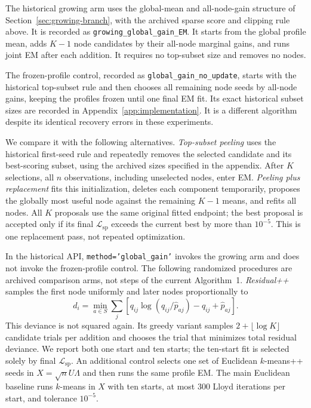 The historical growing arm uses the global-mean and all-node-gain structure of Section~\ref{sec:growing-branch}, with the archived sparse score and clipping rule above. It is recorded as
\texttt{growing\_global\_gain\_EM}. It starts from the global profile mean,
adds $K-1$ node candidates by their all-node marginal gains, and runs joint
EM after each addition. It requires no top-subset size and removes no nodes.

The frozen-profile control, recorded as \texttt{global\_gain\_no\_update},
starts with the historical top-subset rule and then chooses all remaining
node seeds by all-node gains, keeping the profiles frozen until one final EM
fit. Its exact historical subset sizes are recorded in
Appendix~\ref{app:implementation}. It is a different algorithm despite its
identical recovery errors in these experiments.

We compare it with the following alternatives. \emph{Top-subset peeling}
uses the historical first-seed rule and repeatedly removes the selected candidate and its best-scoring subset, using the archived sizes specified in the appendix.
After $K$ selections, all $n$ observations, including unselected nodes, enter
EM. \emph{Peeling plus replacement} fits this initialization, deletes each
component temporarily, proposes the globally most useful node against the
remaining $K-1$ means, and refits all nodes. All $K$ proposals use the same
original fitted endpoint; the best proposal is accepted only if its final
$\mathcal L_{\mathrm{sp}}$ exceeds the current best by more than $10^{-5}$. This is one
replacement pass, not repeated optimization.

In the historical API, \texttt{method='global\_gain'} invokes the growing arm and does not invoke the frozen-profile control. The following randomized procedures are archived comparison arms, not steps of the current Algorithm~1. \emph{Residual++} samples
the first node uniformly and later nodes proportionally to
\begin{equation}
 d_i=\min_{a\in S}\sum_j
 \left[q_{ij}\log(q_{ij}/\widehat p_{aj})-q_{ij}+\widehat p_{aj}\right].
\end{equation}
This deviance is not squared again. Its greedy variant samples
$2+\lfloor\log K\rfloor$ candidate trials per addition and chooses the trial
that minimizes total residual deviance. We report both one start and ten
starts; the ten-start fit is selected solely by final $\mathcal L_{\mathrm{sp}}$.
An additional control selects one set of Euclidean $k$-means++ seeds in
$X=\sqrt n U\Lambda$ and then runs the same profile EM.
The main Euclidean baseline runs $k$-means in $X$ with ten starts, at most
300 Lloyd iterations per start, and tolerance $10^{-5}$.

